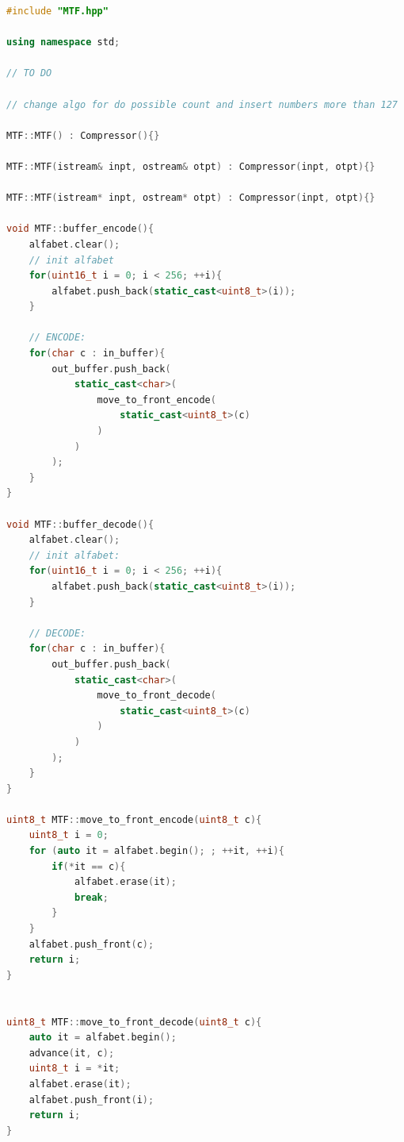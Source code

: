 \begin{lstlisting}[language=C++]
#include "MTF.hpp"

using namespace std;

// TO DO

// change algo for do possible count and insert numbers more than 127

MTF::MTF() : Compressor(){}

MTF::MTF(istream& inpt, ostream& otpt) : Compressor(inpt, otpt){}

MTF::MTF(istream* inpt, ostream* otpt) : Compressor(inpt, otpt){}

void MTF::buffer_encode(){
    alfabet.clear();
    // init alfabet
    for(uint16_t i = 0; i < 256; ++i){
        alfabet.push_back(static_cast<uint8_t>(i));
    }

    // ENCODE:
    for(char c : in_buffer){
        out_buffer.push_back(
            static_cast<char>(
                move_to_front_encode(
                    static_cast<uint8_t>(c)
                )
            )
        );
    }
}

void MTF::buffer_decode(){
    alfabet.clear();
    // init alfabet:
    for(uint16_t i = 0; i < 256; ++i){
        alfabet.push_back(static_cast<uint8_t>(i));
    }

    // DECODE:
    for(char c : in_buffer){
        out_buffer.push_back(
            static_cast<char>(
                move_to_front_decode(
                    static_cast<uint8_t>(c)
                )
            )
        );
    }
}

uint8_t MTF::move_to_front_encode(uint8_t c){
    uint8_t i = 0;
    for (auto it = alfabet.begin(); ; ++it, ++i){
        if(*it == c){
            alfabet.erase(it);
            break;
        }
    }
    alfabet.push_front(c);
    return i;
}


uint8_t MTF::move_to_front_decode(uint8_t c){
    auto it = alfabet.begin();
    advance(it, c);
    uint8_t i = *it;
    alfabet.erase(it);
    alfabet.push_front(i);
    return i;
}
\end{lstlisting}

